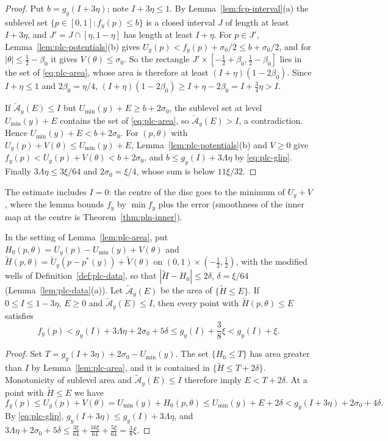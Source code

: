 \begin{proof}
Put $b=g_y(I+3\eta)$; note $I+3\eta\le1$. By Lemma~\ref{lem:fcp-interval}(a) the sublevel set $\{p\in[0,1]:f_y(p)\le b\}$ is a
closed interval $J$ of length at least $I+3\eta$, and $J'=J\cap[\eta,1-\eta]$ has length at least $I+\eta$. For $p\in J'$,
Lemma~\ref{lem:plc-potentials}(b) gives $U_y(p)<f_y(p)+\sigma_0/2\le b+\sigma_0/2$, and for $|\theta|\le\frac12-\beta_0$ it gives
$V(\theta)\le\sigma_0$. So the rectangle $J'\times[-\frac12+\beta_0,\frac12-\beta_0]$ lies in the set of \eqref{eq:plc-area}, whose area
is therefore at least $(I+\eta)(1-2\beta_0)$. Since $I+\eta\le1$ and $2\beta_0=\eta/4$,
$(I+\eta)(1-2\beta_0)\ge I+\eta-2\beta_0=I+\frac34\eta>I$.

If $\check{\mathcal A}_y(E)\le I$ but $U_{\min}(y)+E\ge b+2\sigma_0$, the sublevel set at level $U_{\min}(y)+E$ contains the set of \eqref{eq:plc-area},
so $\check{\mathcal A}_y(E)>I$, a contradiction. Hence $U_{\min}(y)+E<b+2\sigma_0$. For $(p,\theta)$ with $U_y(p)+V(\theta)\le U_{\min}(y)+E$,
Lemma~\ref{lem:plc-potentials}(b) and $V\ge0$ give $f_y(p)<U_y(p)+V(\theta)<b+2\sigma_0$, and $b\le g_y(I)+3\Lambda\eta$ by
\eqref{eq:plc-glip}. Finally $3\Lambda\eta\le3\xi/64$ and $2\sigma_0=\xi/4$, whose sum is below $11\xi/32$.
\end{proof}

The estimate includes $I=0$: the centre of the disc goes to the minimum of $U_y+V$, where the lemma bounds $f_y$ by
$\min f_y$ plus the error (smoothness of the inner map at the centre is Theorem~\ref{thm:pln-inner}).

\begin{lemma}\label{lem:plc-modified-area}
In the setting of Lemma~\ref{lem:plc-area}, put $H_0(p,\theta)=U_y(p)-U_{\min}(y)+V(\theta)$ and
$\widetilde H(p,\theta)=\widetilde U_y(p-p^*(y))+\widetilde V(\theta)$ on $(0,1)\times(-\frac12,\frac12)$, with the modified wells
of Definition~\ref{def:plc-data}, so that $|\widetilde H-H_0|\le2\delta$, $\delta=\xi/64$ (Lemma~\ref{lem:plc-data}(a)). Let
$\widetilde{\mathcal A}_y(E)$ be the area of $\{\widetilde H\le E\}$.
If $0\le I\le1-3\eta$, $E\ge0$ and $\widetilde{\mathcal A}_y(E)\le I$, then every point with
$\widetilde H(p,\theta)\le E$ satisfies
\[
 f_y(p)<g_y(I)+3\Lambda\eta+2\sigma_0+5\delta
 \le g_y(I)+\frac38\xi<g_y(I)+\xi.
\]
\end{lemma}

\begin{proof}
Set $T=g_y(I+3\eta)+2\sigma_0-U_{\min}(y)$. The set $\{H_0\le T\}$ has area greater than $I$
by Lemma~\ref{lem:plc-area}, and it is contained in
$\{\widetilde H\le T+2\delta\}$. Monotonicity of sublevel area and
$\widetilde{\mathcal A}_y(E)\le I$ therefore imply $E<T+2\delta$.
At a point with $\widetilde H\le E$ we have
\[
 f_y(p)\le U_y(p)+V(\theta)
 =U_{\min}(y)+H_0(p,\theta)
 \le U_{\min}(y)+E+2\delta
 <g_y(I+3\eta)+2\sigma_0+4\delta.
\]
By \eqref{eq:plc-glip}, $g_y(I+3\eta)\le g_y(I)+3\Lambda\eta$, and
$3\Lambda\eta+2\sigma_0+5\delta\le\frac{3\xi}{64}+\frac{16\xi}{64}+\frac{5\xi}{64}=\frac38\xi$.
\end{proof}

